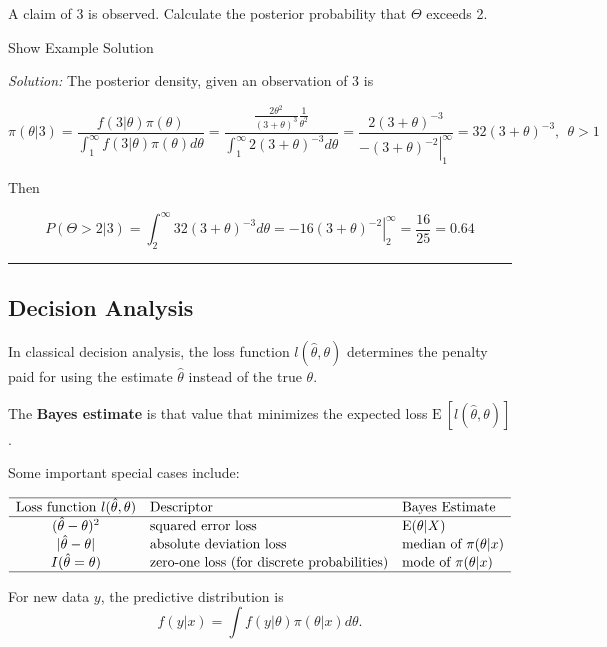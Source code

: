 \documentclass[]{book}
\theoremstyle{definition}
\theoremstyle{definition}
\theoremstyle{definition}
\theoremstyle{remark}
\begin{document}
A claim of 3 is observed. Calculate the posterior probability that
\(\Theta\) exceeds 2.

Show Example Solution

\hypertarget{toggleExampleSelect.4.2}{}
\emph{Solution:} The posterior density, given an observation of 3 is

\[\pi(\theta|3) =  \frac{f(3|\theta)\pi(\theta)}{\int_1^\infty f(3|\theta)\pi(\theta)d\theta} = 
\frac{\frac{2\theta^2}{(3+\theta)^3}\frac{1}{\theta^2}}{\int_1^\infty 2(3+\theta)^{-3} d\theta} = 
\frac{2(3+\theta)^{-3}}{\left. -(3+\theta)^{-2}\right|_1^\infty} = 32(3+\theta)^{-3}, \ \ \theta > 1\]

Then

\[P(\Theta>2|3) = \int_2^\infty 32(3+\theta)^{-3}d\theta = \left. -16(3+\theta)^{-2} \right|_2^\infty = \frac{16}{25} = 0.64\]

\begin{center}\rule{0.5\linewidth}{\linethickness}\end{center}

\subsection{Decision Analysis}\label{decision-analysis}

In classical decision analysis, the loss function
\(l(\hat{\theta}, \theta)\) determines the penalty paid for using the
estimate \(\hat{\theta}\) instead of the true \(\theta\).

The \textbf{Bayes estimate} is that value that minimizes the expected
loss \(\mathrm{E~}[ l(\hat{\theta}, \theta)]\).

Some important special cases include:

\[\begin{array}{cll}
\hline
\text{Loss function } l(\hat{\theta}, \theta) & \text{Descriptor} & \text{Bayes Estimate} \\
\hline 
(\hat{\theta}- \theta)^2 & \text{squared error loss} & \mathrm{E}(\theta|X) \\
|\hat{\theta}- \theta| & \text{absolute deviation loss} & \text{median of } \pi(\theta|x) \\
I(\hat{\theta} =\theta) & \text{zero-one loss (for discrete probabilities)} & \text{mode of } \pi(\theta|x) \\
\hline
\end{array}\]

For new data \(y\), the predictive distribution is
\[f(y|x) = \int f(y|\theta) \pi(\theta|x) d\theta .\]
\end{document}
